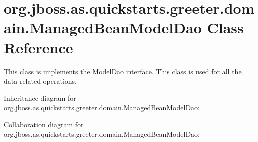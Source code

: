 \hypertarget{classorg_1_1jboss_1_1as_1_1quickstarts_1_1greeter_1_1domain_1_1_managed_bean_model_dao}{}\section{org.\+jboss.\+as.\+quickstarts.\+greeter.\+domain.\+Managed\+Bean\+Model\+Dao Class Reference}
\label{classorg_1_1jboss_1_1as_1_1quickstarts_1_1greeter_1_1domain_1_1_managed_bean_model_dao}


This class is implements the \hyperlink{interfaceorg_1_1jboss_1_1as_1_1quickstarts_1_1greeter_1_1domain_1_1_model_dao}{Model\+Dao} interface. This class is used for all the data related operations.  




Inheritance diagram for org.\+jboss.\+as.\+quickstarts.\+greeter.\+domain.\+Managed\+Bean\+Model\+Dao\+:


Collaboration diagram for org.\+jboss.\+as.\+quickstarts.\+greeter.\+domain.\+Managed\+Bean\+Model\+Dao\+:
